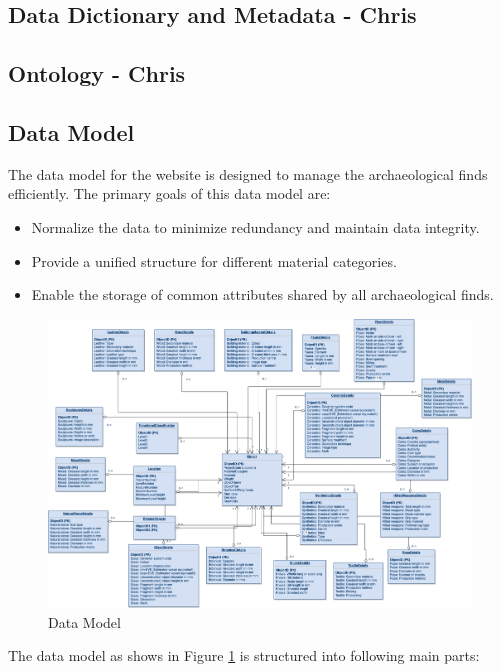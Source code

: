 \subsection{Data Dictionary and Metadata - Chris}

\subsection{Ontology - Chris} 

\subsection{Data Model}

The data model for the website is designed to manage the archaeological finds efficiently. The primary goals of this data model are:

\begin{itemize}
\item Normalize the data to minimize redundancy and maintain data integrity.
\item Provide a unified structure for different material categories.
\item Enable the storage of common attributes shared by all archaeological finds.
\end{itemize}

 \begin{figure}[!]
    \centering
    \includegraphics[width=0.8\paperwidth]{media/final data model.png}
    \caption{Data Model}
    \label{fig:data model}
\end{figure}

The data model as shows in Figure \ref{fig:data model} is structured into following main parts:

